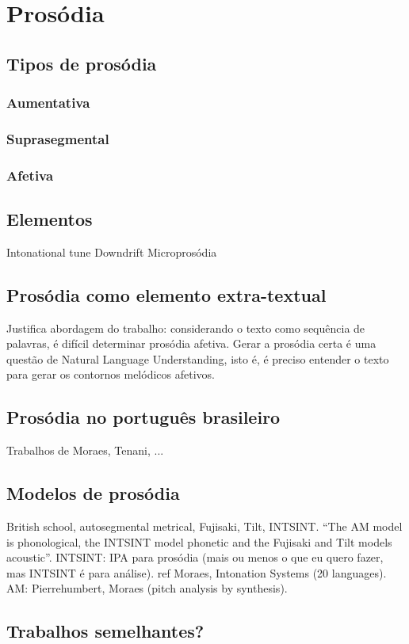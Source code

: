\section{Prosódia}
\subsection{Tipos de prosódia}
\subsubsection{Aumentativa}
\subsubsection{Suprasegmental}
\subsubsection{Afetiva}
\subsection{Elementos}
Intonational tune
Downdrift
Microprosódia
\subsection{Prosódia como elemento extra-textual}
Justifica abordagem do trabalho: considerando o texto como sequência de
palavras, é difícil determinar prosódia afetiva. Gerar a prosódia certa é uma
questão de Natural Language Understanding, isto é, é preciso entender o texto
para gerar os contornos melódicos afetivos.
\subsection{Prosódia no português brasileiro}
Trabalhos de Moraes, Tenani, ...
\subsection{Modelos de prosódia}
British school, autosegmental metrical, Fujisaki, Tilt, INTSINT.
``The AM model is phonological, the INTSINT model phonetic and the Fujisaki and Tilt models acoustic''.
INTSINT: IPA para prosódia (mais ou menos o que eu quero fazer, mas INTSINT é
para análise).
ref Moraes, Intonation Systems (20 languages).
AM: Pierrehumbert, Moraes (pitch analysis by synthesis).
\subsection{Trabalhos semelhantes?}